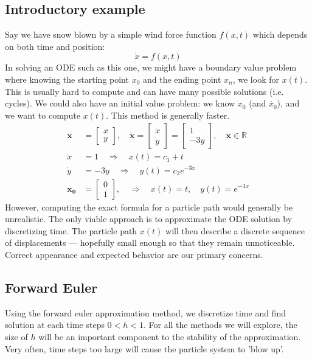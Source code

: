 \documentclass{article}
\begin{document}
\subsection{Introductory example}
Say we have snow blown by a simple wind force function $f(x, t)$ which depends on both time and position:
\[\dot{x} = f(x, t)\]
In solving an ODE such as this one, we might have a boundary value problem where knowing the starting point $x_0$ and the ending point $x_n$, we look for $x(t)$. This is usually hard to compute and can have many possible solutions (i.e. cycles). We could also have an initial value problem: we know $x_0$ (and $\dot{x_0}$), and we want to compute $x(t)$. This method is generally faster.
\begin{align*}
    \mathbf{x} &= \begin{bmatrix} x \\ y \end{bmatrix}, \quad
    \mathbf{\dot{x}} = \begin{bmatrix} \dot{x} \\ \dot{y} \end{bmatrix} = \begin{bmatrix} 1 \\ -3y \end{bmatrix}, \quad
    \mathbf{x} \in \mathbb{R} \\
    \dot{x} &= 1 \quad \Rightarrow \quad x(t) = c_1+t \\
    \dot{y} &= -3y \quad \Rightarrow \quad y(t) = c_2 e^{-3 x} \\
    \mathbf{x_0} &= \begin{bmatrix} 0 \\ 1 \end{bmatrix}, \quad \Rightarrow \quad 
    x(t) = t, \quad y(t) = e^{-3 x}
\end{align*}
However, computing the exact formula for a particle path would generally be unrealistic. The only viable approach is to approximate the ODE solution by discretizing time. The particle path $x(t)$ will then describe a discrete sequence of displacements --- hopefully small enough so that they remain unnoticeable. Correct appearance and expected behavior are our primary concerns.
\subsection{Forward Euler}
Using the forward euler approximation method, we discretize time and find solution at each time steps $0<h<1$. For all the methods we will explore, the size of $h$ will be an important component to the stability of the approximation. Very often, time steps too large will cause the particle system to 'blow up'.
\end{document}

